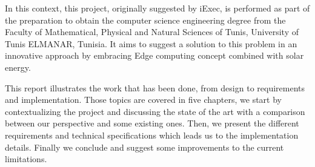 In this context, this project, originally suggested by iExec, is performed as part of the
preparation to obtain the computer science engineering degree from the Faculty of Mathematical,
Physical and Natural Sciences of Tunis, University of Tunis ELMANAR, Tunisia. It aims to suggest a
solution to this problem in an innovative approach by embracing Edge computing concept combined
with solar energy. 

This report
illustrates the work that has been done, from design to requirements and implementation. Those topics
are covered in five chapters, we start by contextualizing the project and discussing the state of the
art with a comparison between our perspective and some existing ones. Then, we present the different
requirements and technical specifications which leads us to the implementation details. Finally we
conclude and suggest some improvements to the current limitations.
